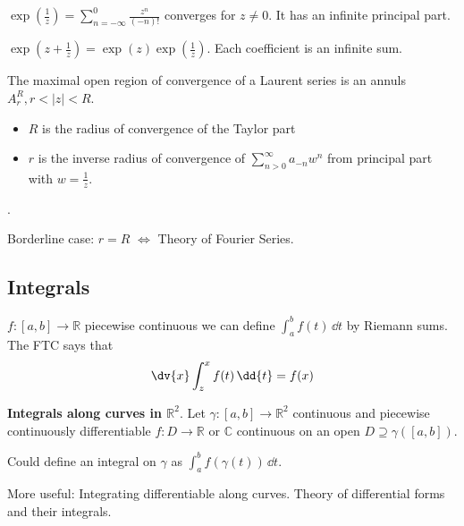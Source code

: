 \documentclass{report}
\begin{document}
\begin{examples}
    \begin{example}
        $\exp(\frac{1}{z}) = \sum_{n = -\infty}^{0} \frac{z^{n}}{(-n)!}$ converges for $z \neq 0$. It has an infinite principal part.
    \end{example}
    \begin{example}
        $\exp(z + \frac{1}{z}) = \exp(z)\exp(\frac{1}{z})$. Each coefficient is an infinite sum.
    \end{example}
\end{examples}

\begin{theorem}{}
    The maximal open region of convergence of a Laurent series is an annuls $A_{r}^{R}, r < \lvert  z \rvert < R$. 
        \begin{itemize}
            \item $R$ is the radius of convergence of the Taylor part

            \item $r$ is the inverse radius of convergence of $\sum_{n > 0}^{\infty} a_{-n}w^{n}$ from principal part with $w = \frac{1}{z}$.
        \end{itemize}
\end{theorem}.

Borderline case: $r = R$ $\iff$ Theory of Fourier Series.

\begin{topic}
    \section{Integrals}
\end{topic}
$f: [a, b] \rightarrow \mathbb{R}$ piecewise continuous we can define $\int_{a}^{b} f(t) \, \dd{t} $ by Riemann sums. The FTC says that 
    \begin{equation*}
        \dv{x} \int_{z}^{x} f(t) \, \dd{t}  = f(x)
    \end{equation*}

\textbf{Integrals along curves in $\mathbb{R}^{2}$}. Let $\gamma : [a, b] \rightarrow \mathbb{R}^{2}$ continuous and piecewise continuously differentiable $f: D \rightarrow \mathbb{R}$ or $\mathbb{C}$ continuous on an open $D \supseteq \gamma([a ,b])$.

Could define an integral on $\gamma$ as $\int_{a}^{b} f(\gamma(t)) \, \dd{t} $.

More useful: Integrating differentiable along curves. Theory of differential forms and their integrals.
\end{document}
